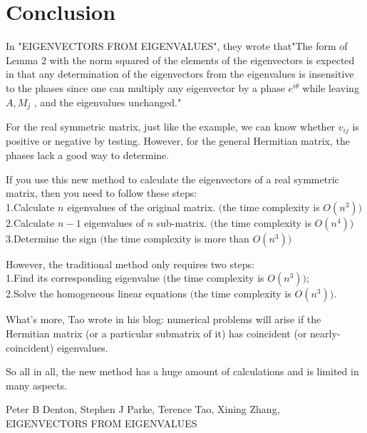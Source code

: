 \documentclass{amsart}
\theoremstyle{definition}
\theoremstyle{remark}
\numberwithin{equation}{section}
\begin{document}
\section{Conclusion}
In "EIGENVECTORS FROM EIGENVALUES", they wrote that"The form of Lemma 2 with the norm squared of the elements of the eigenvectors is expected in that any determination of the eigenvectors from the
eigenvalues is insensitive to the phases since one can multiply any eigenvector by a
phase $e^{i\theta}$ while leaving $ A, M_{j}$ , and the eigenvalues unchanged."

For the real symmetric matrix, just like the example, we can know whether $v_{ij}$ is positive or negative by testing. However, for the general Hermitian matrix, the phases lack a good way to determine.

If you use this new method to calculate the eigenvectors of a real symmetric matrix, then you need to follow these steps:\\
1.Calculate $n$ eigenvalues of the original matrix. $($the time complexity is $O\left(n^{3}\right))$\\
2.Calculate $n-1$ eigenvalues of $n$ sub-matrix. $($the time complexity is $O\left(n^{4}\right))$\\ 
3.Determine the sign $($the time complexity is more than $O\left(n^{3}\right))$

However, the traditional method only requires two steps: \\
1.Find its corresponding eigenvalue $($the time complexity is $O\left(n^{3}\right))$; \\
2.Solve the homogeneous linear equations $($the time complexity is $O\left(n^{3}\right))$.

What's more, Tao wrote in his blog: numerical problems will arise if the Hermitian matrix (or a particular submatrix of it) has coincident (or nearly-coincident) eigenvalues.

 So all in all, the new method has a huge amount of calculations and is limited in many aspects.

	\begin{thebibliography}{1}	
	Peter B Denton, Stephen J Parke, Terence Tao, Xining Zhang, EIGENVECTORS FROM EIGENVALUES
	\end{thebibliography}


	
\end{document}
